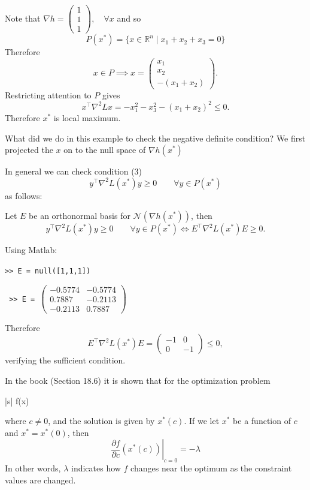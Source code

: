 \documentclass{article}
\begin{document}
	Note that 
	$\nabla h 
		= \begin{pmatrix}
	    	1\\1\\1
	  	  \end{pmatrix}, \quad \forall x$ 
	and so
	\[ 
		P(x^{\ast}) = \{x\in \mathbb{R}^n \mid x_1 + x_2 + x_3 = 0 \}
	\]
	Therefore
	\[
		x\in P \implies  
		x = \begin{pmatrix}
	    		x_1\\
	    		x_2\\
	    		-(x_1 + x_2)
	  		\end{pmatrix}.
	\]
	Restricting attention to $P$ gives
	\[ 
		x^\top \nabla^2 L x = -x_1^2 - x_3^2 - (x_1 + x_2)^2 \leq 0.
	\]	
	Therefore $x^{\ast}$ is local maximum.

	What did we do in this example to check the negative definite condition?  We first projected the $x$ on to the null space of $\nabla h(x^{\ast})$
	
	In general we can check condition (3)
	\[  
		y^\top \nabla^2L(x^{\ast})y \geq 0 \qquad \forall y \in P(x^{\ast}) 
	\]
	as follows:
	
	
	Let $E$ be an orthonormal basis for $\mathcal{N}(\nabla h(x^{\ast}))$, then
	\[ 
		y^\top \nabla^2L(x^{\ast})y \geq 0 \qquad \forall y \in P(x^{\ast}) \iff E^\top \nabla^2 L(x^{\ast}) E \geq 0.
	\]	

	Using Matlab:
	
	
	\texttt{>> E = null([1,1,1])}
	
	\texttt{
		>> E = $\begin{pmatrix}
	   			-0.5774 & -0.5774 \\
	    		0.7887 & -0.2113 \\
	   			-0.2113 & 0.7887
	   		\end{pmatrix}$
	}
	
	Therefore
	\[
	 	E^\top \nabla^2 L(x^{\ast})E 
	 		= \begin{pmatrix}
	    		-1 & 0\\
	    		0 & -1
	  		  \end{pmatrix} \leq 0,
	\]	
	verifying the sufficient condition.
	
\par{}
	
	
	In the book (Section 18.6) it is shown that for the optimization problem
	\begin{mini*}|s|
		{}{f(x)}{}{}
	\end{mini*}
	where $c\neq 0$, and the solution is given by $x^\ast(c)$.  If we let $x^\ast$ be a function of $c$ and $x^{\ast} = x^\ast(0)$, then
	\[ 
		\left. \frac{\partial f}{\partial c}(x^\ast(c))\right|_{c = 0} = -\lambda 
	\]
	In other words, $\lambda$ indicates how $f$ changes near the optimum as the constraint values are changed.
	
\end{document}
